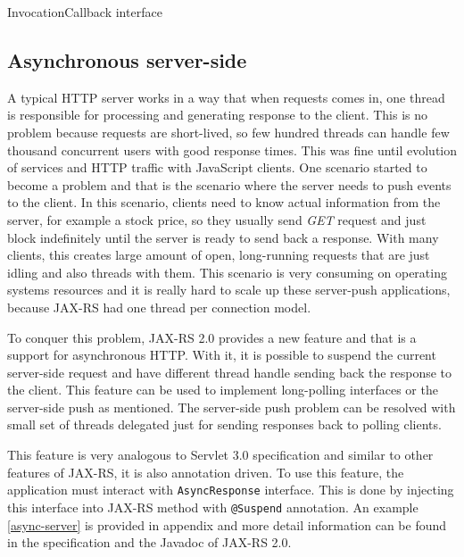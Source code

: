 \documentclass[12pt,final,oneside]{fithesis2}
\begin{document}
\begin{listing}[ht]
	\inputminted[]{java}{sources/callback.java}
	\caption{InvocationCallback interface}
	\label{callback}
\end{listing}

\subsection*{Asynchronous server-side}
A typical HTTP server works in a way that when requests comes in, one thread is responsible for processing and generating response to the client. This is no problem because requests are short-lived, so few hundred threads can handle few thousand concurrent users with good response times. This was fine until evolution of services and HTTP traffic with JavaScript clients. One scenario started to become a problem and that is the scenario where the server needs to push events to the client. In this scenario, clients need to know actual information from the server, for example a stock price, so they usually send \textit{GET} request and just block indefinitely until the server is ready to send back a response. With many clients, this creates large amount of open, long-running requests that are just idling and also threads with them. This scenario is very consuming on operating systems resources and it is really hard to scale up these server-push applications, because JAX-RS had one thread per connection model.\cite{resteasy-book}

To conquer this problem, JAX-RS 2.0 provides a new feature and that is a support for asynchronous HTTP. With it, it is possible to suspend the current server-side request and have different thread handle sending back the response to the client. This feature can be used to implement long-polling interfaces or the server-side push as mentioned. The server-side push problem can be resolved with small set of threads delegated just for sending  responses back to polling clients.

This feature is very analogous to Servlet 3.0 specification and similar to other features of JAX-RS, it is also annotation driven. To use this feature, the application must interact with \texttt{AsyncResponse} interface. This is done by injecting this interface into JAX-RS method with \texttt{@Suspend} annotation.\cite{resteasy-book}\cite{jax-rs-2.0} An example  \ref{async-server} is provided in appendix and more detail information can be found in the specification and the Javadoc of JAX-RS 2.0.
\end{document}
